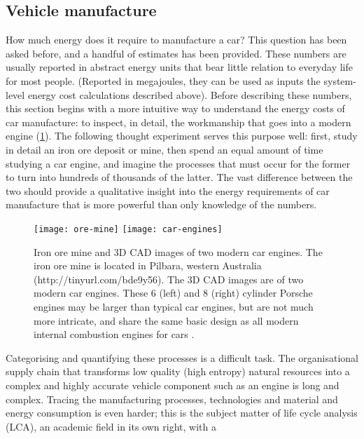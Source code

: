 \subsection{Vehicle manufacture} 
How much energy does it require to manufacture a car? This question has been
asked before, and a handful of estimates has been provided. These numbers
are usually reported in abstract energy
units that bear little relation to everyday life for most people. (Reported in
megajoules, they can be used as inputs the system-level energy cost
calculations described above).
Before describing these numbers, this section begins with a more intuitive
way to understand the energy costs
of car manufacture: to inspect, in detail, the workmanship that goes into a
modern engine
(\cref{f:car-engine}). The following thought experiment serves this purpose
well: first, study in detail an iron ore
deposit or mine, then spend an equal amount of time studying a car
engine, and imagine the processes that must occur for the former to
turn into hundreds of thousands of the latter. The vast difference between the two
should provide a qualitative insight into the energy requirements of car
manufacture that is more powerful than only knowledge of the numbers.
\begin{figure}[t]
 \begin{center}
 \texttt{[image: ore-mine]}
 \texttt{[image: car-engines]}\end{center}
 \caption[Iron ore mine and 3D CAD images of two modern car engines]{
 Iron ore mine and 3D CAD images of two modern car engines. The iron
ore mine is located in Pilbara, western Australia (http://tinyurl.com/bde9y56).
The 3D CAD images are of two modern car engines. These 6 (left) and 8 (right)
cylinder Porsche engines may be larger than typical car engines, but are not
much more intricate, and share the same basic design as all modern internal
combustion engines for cars \citep[p.~1043]{grote2009springer}.}
 \label{f:car-engine}
\end{figure}
Categorising and quantifying these processes is a difficult task.
The organisational supply chain that transforms
low quality (high entropy) natural resources into a
complex and highly accurate vehicle component such as an engine is long
and complex. Tracing the manufacturing processes, technologies and
material and energy consumption is even harder; this is the subject matter
of life cycle analysis (LCA), an academic field in its own right, with a
